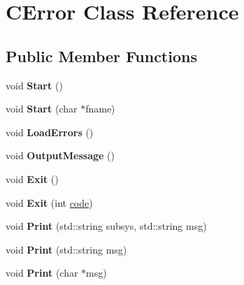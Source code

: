 \hypertarget{class_c_error}{\section{C\+Error Class Reference}
\label{class_c_error}
}
\subsection*{Public Member Functions}
\begin{DoxyCompactItemize}
\item 
\hypertarget{class_c_error_a9cd5c62a518db167f64a766eadf8272c}{void {\bfseries Start} ()}\label{class_c_error_a9cd5c62a518db167f64a766eadf8272c}

\item 
\hypertarget{class_c_error_a9713afa8294af45c0663404014243d29}{void {\bfseries Start} (char $\ast$fname)}\label{class_c_error_a9713afa8294af45c0663404014243d29}

\item 
\hypertarget{class_c_error_a6741487a0d531bd44f4998afc2737a6f}{void {\bfseries Load\+Errors} ()}\label{class_c_error_a6741487a0d531bd44f4998afc2737a6f}

\item 
\hypertarget{class_c_error_a4f4ec89e91542952a49b97b9cb6bdffb}{void {\bfseries Output\+Message} ()}\label{class_c_error_a4f4ec89e91542952a49b97b9cb6bdffb}

\item 
\hypertarget{class_c_error_ad145787d1db099296c13d59047b7dbf6}{void {\bfseries Exit} ()}\label{class_c_error_ad145787d1db099296c13d59047b7dbf6}

\item 
\hypertarget{class_c_error_a90b96783e5ee15b7c0132b546ea7bb8e}{void {\bfseries Exit} (int \hyperlink{structcode}{code})}\label{class_c_error_a90b96783e5ee15b7c0132b546ea7bb8e}

\item 
\hypertarget{class_c_error_a71d9200a9177c509fe4fa33d0aaa3be4}{void {\bfseries Print} (std\+::string subsys, std\+::string msg)}\label{class_c_error_a71d9200a9177c509fe4fa33d0aaa3be4}

\item 
\hypertarget{class_c_error_a31e11b4b253aaa145ecb60213665b6aa}{void {\bfseries Print} (std\+::string msg)}\label{class_c_error_a31e11b4b253aaa145ecb60213665b6aa}

\item 
\hypertarget{class_c_error_a94fce20bf7a1426e6c9caeafa6dd0e6d}{void {\bfseries Print} (char $\ast$msg)}\label{class_c_error_a94fce20bf7a1426e6c9caeafa6dd0e6d}


\end{DoxyCompactItemize}

